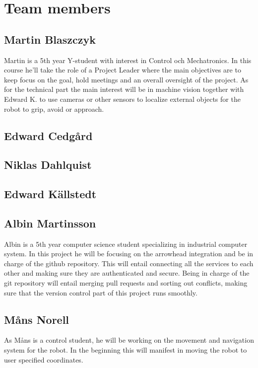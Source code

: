 \section{Team members}

\subsection{Martin Blaszczyk}
Martin is a 5th year Y-student with interest in Control och Mechatronics. 
In this course he'll take the role of a Project Leader where the main objectives
are to keep focus on the goal, hold meetings and an overall oversight of the project. 
As for the technical part the main interest will be in machine vision together with
Edward K. to use cameras or other sensors to localize external objects for the 
robot to grip, avoid or approach. 

\subsection{Edward Cedgård}

\subsection{Niklas Dahlquist}

\subsection{Edward Källstedt}

\subsection{Albin Martinsson}
Albin is a 5th year computer science student specializing in industrial computer system. In this project he will be focusing on the 
arrowhead integration and be in charge of the github repository. This will entail connecting all the services to each other and
making sure they are authenticated and secure. Being in charge of the git repository will entail merging pull requests and sorting
out conflicts, making sure that the version control part of this project runs smoothly.

\subsection{Måns Norell}
As Måns is a control student, he will be working on the movement and navigation system for the robot. In the beginning this will manifest in moving the robot to user specified coordinates.









